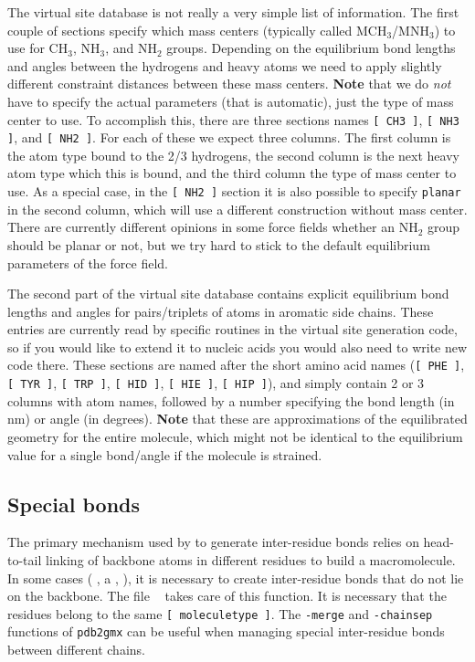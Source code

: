 The virtual site database is not really a very simple list of information. The first couple of sections
specify which mass centers (typically called MCH$_3$/MNH$_3$) to use for CH$_3$, NH$_3$, 
and NH$_2$ groups. Depending on the 
equilibrium bond lengths and angles between the hydrogens and heavy atoms we need to apply
slightly different constraint distances between these mass centers. {\bf Note} that we do {\em not} have to
specify the actual parameters (that is automatic), just the type of mass center to use. To accomplish this,
there are three sections names \verb+[ CH3 ]+, \verb+[ NH3 ]+, and \verb+[ NH2 ]+. For each of these we
expect three columns. The first column is the atom type bound to the 2/3 hydrogens, the second column
is the next heavy atom type which this is bound, and the third column the type of mass center to use.
As a special case, in the  \verb+[ NH2 ]+ section it is also possible to specify \verb+planar+ in the second
column, which will use a different construction without mass center. There are currently different opinions
in some force fields whether an NH$_2$ group should be planar or not, but we try hard to stick to the
default equilibrium parameters of the force field.

The second part of the virtual site database contains explicit equilibrium bond lengths and angles
for pairs/triplets of atoms in aromatic side chains. These entries are currently read by specific routines
in the virtual site generation code, so if you would like to extend it {\eg} to nucleic acids you would also
need to write new code there. These sections are named after the short amino acid names
(\verb+[ PHE ]+, \verb+[ TYR ]+, \verb+[ TRP ]+, \verb+[ HID ]+, \verb+[ HIE ]+, \verb+[ HIP ]+), and simply
contain 2 or 3 columns with atom names, followed by a number specifying the bond length (in nm) or angle
(in degrees). {\bf Note} that these are approximations of the equilibrated geometry for the entire molecule, 
which might not be identical to the equilibrium value for a single bond/angle if the molecule is strained.

\subsection{Special bonds}
\label{subsec:specbond}
The primary mechanism used by {\tt {}} to generate
inter-residue bonds relies on head-to-tail linking of backbone atoms
in different residues to build a macromolecule. In some cases ({\eg}
, a ,
), it is necessary to create
inter-residue bonds that do not lie on the backbone. The file {\tt
  } takes care of this function. It is
necessary that the residues belong to the same {\tt [~moleculetype~]}.
The {\tt -merge} and {\tt -chainsep} functions of {\tt pdb2gmx} can be
useful when managing special inter-residue bonds between different
chains.

